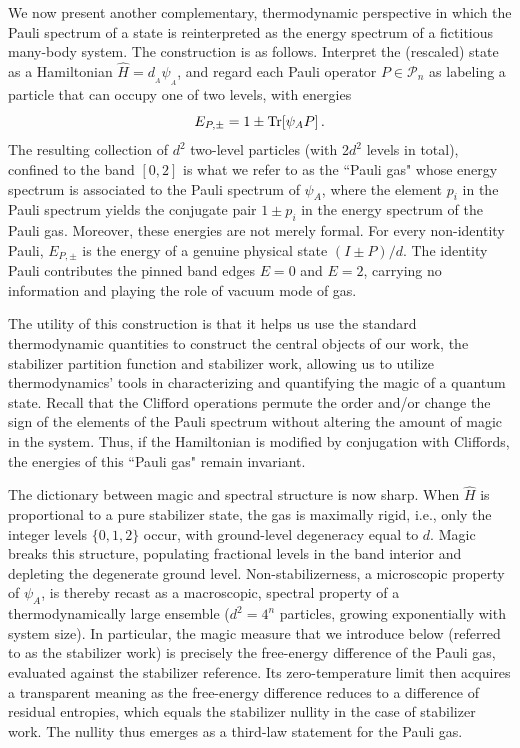 \documentclass[aps,pra,superscriptaddress,twocolumn,longbibliography]{revtex4-2}
\newcommand{\tr}{{\rm Tr}}
\def\mP{\mathcal{P}}
\begin{document}
We now present another complementary, thermodynamic perspective in which the Pauli spectrum of a state is reinterpreted as the energy spectrum of a fictitious many-body system.
The construction is as follows.
Interpret the (rescaled) state as a Hamiltonian $\hat{H} = d_{_A}\psi_{_A}$, and regard each Pauli operator $P\in \mP_n$ as labeling a particle that can occupy one of two levels, with energies
$$E_{P,\pm} = 1 \pm \tr[\psi_A P]\,.$$
The resulting collection of $d^2$ two-level particles (with 2$d^2$ levels in total), confined to the band $[0,2]$ is what we refer to as the ``Pauli gas" whose energy spectrum is associated to the Pauli spectrum of $\psi_A$, where the element $p_i$ in the Pauli spectrum yields the conjugate pair $1\pm p_i$ in the energy spectrum of the Pauli gas.
Moreover, these energies are not merely formal. For every non-identity Pauli, $E_{P,\pm}$ is the energy of a genuine physical state $(I\pm P)/d$. The identity Pauli contributes the pinned band edges $E=0$ and $E=2$, carrying no information and playing the role of vacuum mode of gas.

The utility of this construction is that it helps us use the standard thermodynamic quantities to construct
the central objects of our work, the stabilizer partition function and stabilizer work, allowing us to utilize thermodynamics' tools in characterizing and quantifying the magic of a quantum state.
Recall that the Clifford operations permute the order and/or change the sign of the elements of the Pauli spectrum without altering the amount of magic in the system.
Thus, if the Hamiltonian is modified by conjugation with Cliffords, the energies of this ``Pauli gas" remain invariant.

The dictionary between magic and spectral structure is now sharp. When $\hat{H}$ is proportional to a pure stabilizer state, the gas is maximally rigid, i.e., only the integer levels $\{0,1,2\}$ occur, with ground-level degeneracy equal to $d$.
Magic breaks this structure, populating fractional levels in the band interior and depleting the degenerate ground level.
Non-stabilizerness, a microscopic property of $\psi_A$, is thereby recast as a macroscopic, spectral property of a thermodynamically large ensemble ($d^2 = 4^n$ particles, growing exponentially with system size).
In particular, the magic measure that we introduce below (referred to as the stabilizer work) is precisely the free-energy difference of the Pauli gas, evaluated against the stabilizer reference.
Its zero-temperature limit then acquires a transparent meaning as the free-energy difference reduces to a difference of residual entropies, which equals the stabilizer nullity in the case of stabilizer work. The nullity thus emerges as a third-law statement for the Pauli gas.
\end{document}
